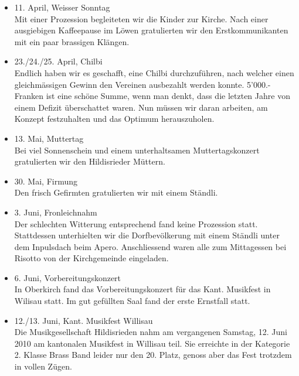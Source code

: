 \begin{history}
\begin{itemize}
        \item 11. April, Weisser Sonntag\\
              Mit einer Prozession begleiteten wir die Kinder zur Kirche. Nach
              einer ausgiebigen Kaffeepause im Löwen gratulierten wir den
              Erstkommunikanten mit ein paar brassigen Klängen.

        \item 23./24./25. April, Chilbi\\
              Endlich haben wir es geschafft, eine Chilbi durchzuführen, nach
              welcher einen gleichmässigen Gewinn den Vereinen ausbezahlt werden
              konnte. 5'000.- Franken ist eine schöne Summe, wenn man denkt,
              dass die letzten Jahre von einem Defizit überschattet waren. Nun
              müssen wir daran arbeiten, am Konzept festzuhalten und das Optimum
              herauszuholen.

        \item 13. Mai, Muttertag\\
              Bei viel Sonnenschein und einem unterhaltsamen Muttertagskonzert
              gratulierten wir den Hildisrieder Müttern.

        \item 30. Mai, Firmung\\
              Den frisch Gefirmten gratulierten wir mit einem Ständli.

        \item 3. Juni, Fronleichnahm\\
              Der schlechten Witterung entsprechend fand keine Prozession statt.
              Stattdessen unterhielten wir die Dorfbevölkerung mit einem Ständli
              unter dem Inpulsdach beim Apero. Anschliessend waren alle zum
              Mittagessen bei Risotto von der Kirchgemeinde eingeladen.

        \item 6. Juni, Vorbereitungskonzert\\
              In Oberkirch fand das Vorbereitungskonzert für das Kant. Musikfest
              in Wilisau statt. Im gut gefüllten Saal fand der erste Ernstfall
              statt.

        \item 12./13. Juni, Kant. Musikfest Willisau\\
              Die Musikgesellschaft Hildisrieden nahm am vergangenen Samstag, 12. Juni
              2010 am kantonalen Musikfest in Willisau teil. Sie erreichte  in der
              Kategorie 2. Klasse Brass Band leider nur den 20. Platz, genoss aber das
              Fest trotzdem in vollen Zügen.


\end{itemize}
\end{history}
